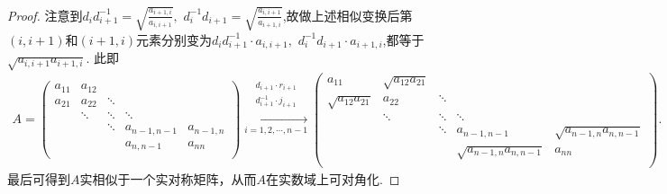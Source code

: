 \documentclass[../../main.tex]{subfiles}%
\begin{document}
\begin{proof}
注意到$d_i d_{i+1}^{-1}=\sqrt{\frac{a_{i+1,i}}{a_{i,i+1}}},\,\,d_i^{-1} d_{i+1}=\sqrt{\frac{a_{i,i+1}}{a_{i+1,i}}}$,故做上述相似变换后第$(i,i+1)$和$(i+1,i)$元素分别变为$d_id_{i+1}^{-1}\cdot a_{i,i+1},\,\,d_{i}^{-1}d_{i+1}\cdot a_{i+1,i}$,都等于$\sqrt{a_{i,i+1}a_{i+1,i}}$.
此即
\begin{align*}
A=\left( \begin{matrix}
a_{11}&		a_{12}&		&		&		\\
a_{21}&		a_{22}&		\ddots&		&		\\
&		\ddots&		\ddots&		\ddots&		\\
&		&		\ddots&		a_{n-1,n-1}&		a_{n-1,n}\\
&		&		&		a_{n,n-1}&		a_{nn}\\
\end{matrix} \right) \xrightarrow[i=1,2,\cdots ,n-1]{\begin{array}{c}
d_{i+1}\cdot r_{i+1}\\
d_{i+1}^{-1}\cdot j_{i+1}\\
\end{array}}\left( \begin{matrix}
a_{11}&		\sqrt{a_{12}a_{21}}&		&		&		\\
\sqrt{a_{12}a_{21}}&		a_{22}&		\ddots&		&		\\
&		\ddots&		\ddots&		\ddots&		\\
&		&		\ddots&		a_{n-1,n-1}&		\sqrt{a_{n-1,n}a_{n,n-1}}\\
&		&		&		\sqrt{a_{n-1,n}a_{n,n-1}}&		a_{nn}\\
\end{matrix} \right) .
\end{align*}
最后可得到\(A\)实相似于一个实对称矩阵，从而\(A\)在实数域上可对角化.
\end{proof}
\end{document}
